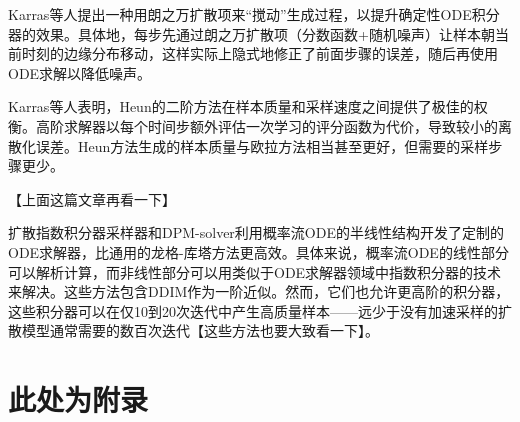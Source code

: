 \documentclass[11pt,a4paper,UTF8]{ctexart}
\begin{document}
Karras等人\cite{karras2022elucidating}提出一种用朗之万扩散项来“搅动”生成过程，以提升确定性ODE积分器的效果。具体地，每步先通过朗之万扩散项（分数函数+随机噪声）让样本朝当前时刻的边缘分布移动，这样实际上隐式地修正了前面步骤的误差，随后再使用ODE求解以降低噪声。

Karras等人\cite{karras2022elucidating}表明，Heun的二阶方法\cite{ascher1998computer}在样本质量和采样速度之间提供了极佳的权衡。高阶求解器以每个时间步额外评估一次学习的评分函数为代价，导致较小的离散化误差。Heun方法生成的样本质量与欧拉方法相当甚至更好，但需要的采样步骤更少。

【上面这篇文章再看一下】

扩散指数积分器采样器\cite{zhang2022fast}和DPM-solver\cite{lu2022dpm}利用概率流ODE的半线性结构开发了定制的ODE求解器，比通用的龙格-库塔方法更高效。具体来说，概率流ODE的线性部分可以解析计算，而非线性部分可以用类似于ODE求解器领域中指数积分器的技术来解决。这些方法包含DDIM作为一阶近似。然而，它们也允许更高阶的积分器，这些积分器可以在仅10到20次迭代中产生高质量样本——远少于没有加速采样的扩散模型通常需要的数百次迭代【这些方法也要大致看一下】。




\newpage


\newpage
\appendix


\section{此处为附录}
\end{document}
